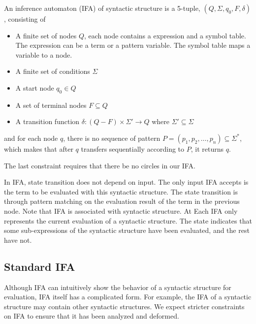 \begin{Def}

An inference automaton (IFA) of syntactic structure  is a 5-tuple, $(Q, \Sigma, q_0, F, \delta)$, consisting of

\begin{itemize}
    \item A finite set of nodes $Q$, each node contains a expression and a symbol table. The expression can be a term or a pattern variable. The symbol table maps a variable to a node.
    \item A finite set of conditions $\Sigma$
    \item A start node $q_0 \in Q$
    \item A set of terminal nodes $F \subseteq Q$
    \item A transition function $\delta: (Q-F) \times \Sigma' \to Q$ where $\Sigma' \subseteq \Sigma$
\end{itemize}


and for each node $q$, there is no sequence of pattern $P = (p_1,p_2,\ldots,p_n)\subseteq \Sigma^*$, which makes that after $q$ transfers sequentially according to $P$, it returns $q$.

\end{Def}

The last constraint requires that there be no circles in our IFA.

In IFA, state transition does not depend on input. The only input IFA accepts is the term to be evaluated with this syntactic structure. The state transition is through pattern matching on the evaluation result of the term in the previous node. Note that IFA is associated with syntactic structure. At Each IFA only represents the current evaluation of a syntactic structure. The state indicates that some
sub-expressions of the syntactic structure have been evaluated, and the rest have not.

\subsection{Standard IFA}

Although IFA can intuitively show the behavior of a syntactic structure for evaluation, IFA itself has a complicated form. For example, the IFA of a syntactic structure may contain other syntactic structures. We expect stricter constraints on IFA to ensure that it has been analyzed and deformed.


